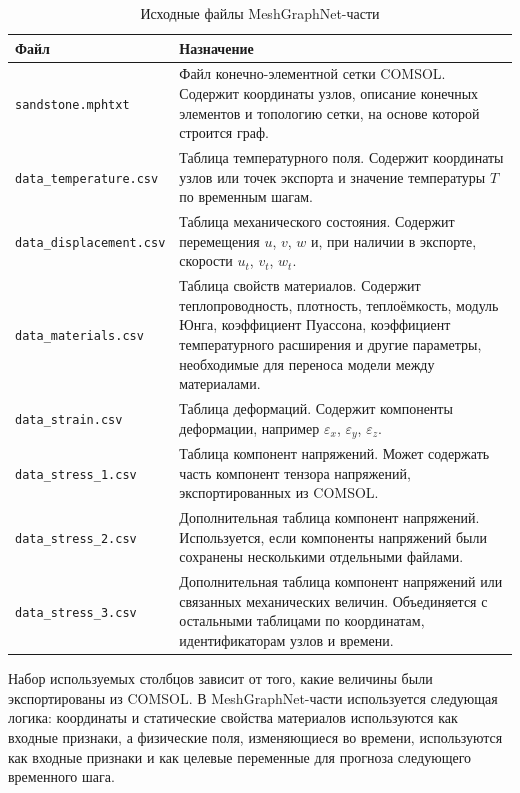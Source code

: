 \begin{table}[h]
\centering
\caption{Исходные файлы MeshGraphNet-части}
\label{tab:mgn_input_files}
\begin{tabular}{|p{}|p{}|}
\hline
\textbf{Файл} & \textbf{Назначение} \\
\hline
\texttt{sandstone.mphtxt} & Файл конечно-элементной сетки COMSOL. Содержит координаты узлов, описание конечных элементов и топологию сетки, на основе которой строится граф. \\
\hline
\texttt{data\_temperature.csv} & Таблица температурного поля. Содержит координаты узлов или точек экспорта и значение температуры $T$ по временным шагам. \\
\hline
\texttt{data\_displacement.csv} & Таблица механического состояния. Содержит перемещения $u$, $v$, $w$ и, при наличии в экспорте, скорости $u_t$, $v_t$, $w_t$. \\
\hline
\texttt{data\_materials.csv} & Таблица свойств материалов. Содержит теплопроводность, плотность, теплоёмкость, модуль Юнга, коэффициент Пуассона, коэффициент температурного расширения и другие параметры, необходимые для переноса модели между материалами. \\
\hline
\texttt{data\_strain.csv} & Таблица деформаций. Содержит компоненты деформации, например $\varepsilon_x$, $\varepsilon_y$, $\varepsilon_z$. \\
\hline
\texttt{data\_stress\_1.csv} & Таблица компонент напряжений. Может содержать часть компонент тензора напряжений, экспортированных из COMSOL. \\
\hline
\texttt{data\_stress\_2.csv} & Дополнительная таблица компонент напряжений. Используется, если компоненты напряжений были сохранены несколькими отдельными файлами. \\
\hline
\texttt{data\_stress\_3.csv} & Дополнительная таблица компонент напряжений или связанных механических величин. Объединяется с остальными таблицами по координатам, идентификаторам узлов и времени. \\
\hline
\end{tabular}
\end{table}

Набор используемых столбцов зависит от того, какие величины были экспортированы из COMSOL. В MeshGraphNet-части используется следующая логика: координаты и статические свойства материалов используются как входные признаки, а физические поля, изменяющиеся во времени, используются как входные признаки и как целевые переменные для прогноза следующего временного шага.

